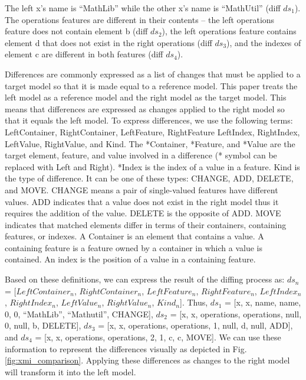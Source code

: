 \documentclass{jot}
\newcommand{\dk}[1]{\textcolor{blue}{\textbf{[Dimitris: #1]}}}
\begin{document}
The left \textsf{x}'s \textsf{name} is ``MathLib'' while the other \textsf{x}'s \textsf{name} is ``MathUtil'' (diff $ds_1$). The \textsf{operations} features are different in their contents -- the left \textsf{operations} feature does not contain element \textsf{b} (diff $ds_2$), the left \textsf{operations} feature contains element \textsf{d} 
that does not exist in the right \textsf{operations} (diff $ds_3$), and the indexes of element \textsf{c} are different in both features (diff $ds_4$).

Differences are commonly expressed as a list of changes that must be applied to a target model so that it is made equal to a reference model.
This paper treats the left model as a reference model and the right model as the target model.
This means that differences are expressed as changes applied to the right model so that it equals the left model.
To express differences, we use the following terms: \textsf{LeftContainer}, \textsf{RightContainer}, \textsf{LeftFeature}, \textsf{RightFeature} \textsf{LeftIndex}, \textsf{RightIndex}, \textsf{LeftValue}, \textsf{RightValue}, and \textsf{Kind}. The \textsf{*Container}, \textsf{*Feature}, and \textsf{*Value} are the target element, feature, and value involved in a difference (\textsf{*} symbol can be replaced with \textsf{Left} and {Right}). \textsf{*Index} is the index of a value in a feature. \textsf{Kind} is the type of difference. It can be one of these types: \textsf{CHANGE}, \textsf{ADD}, \textsf{DELETE}, and \textsf{MOVE}. \textsf{CHANGE} means a pair of single-valued features 
have different values. \textsf{ADD} indicates that a value does not exist in the right model thus it requires the addition of the value. \textsf{DELETE} is the opposite
of \textsf{ADD}. \textsf{MOVE} indicates that matched elements differ in terms of their containers, containing features, or indexes.
A Container is an element that contains a value. A containing feature is a feature owned by a container in which a value is contained. An index is the position of a value in a containing feature.

Based on these definitions, we can express the result of the diffing process as: $ds_{n}$ = [$LeftContainer_n$, $RightContainer_n$, $LeftFeature_n$, $RightFeature_n$, $LeftIndex_n$, $RightIndex_n$, $LeftValue_n$, $RightValue_n$, $Kind_n$]. Thus, $ds_{1}$ =  [\textsf{x}, \textsf{x}, \textsf{name}, \textsf{name}, 0, 0, ``MathLib'', ``Mathutil'', \textsf{CHANGE}], $ds_{2}$ = [\textsf{x}, \textsf{x}, \textsf{operations}, \textsf{operations}, null, 0, null, \textsf{b}, \textsf{DELETE}], $ds_{3}$ = [\textsf{x}, \textsf{x}, \textsf{operations}, \textsf{operations}, 1, null, \textsf{d}, null, \textsf{ADD}], and $ds_{4}$ = [\textsf{x}, \textsf{x}, \textsf{operations}, \textsf{operations}, 2, 1, \textsf{c}, \textsf{c}, \textsf{MOVE}]. We can use these information to represent the differences visually as depicted in Fig. \ref{fig:xmi_comparison}. Applying these differences as changes to the right model will transform it into the left model.  
\end{document}
